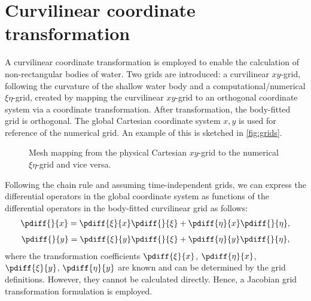 \chapter{Curvilinear coordinate transformation}\label{app:CoordinateTransform}
A curvilinear coordinate transformation is employed to enable the calculation of non-rectangular bodies of water.
Two grids are introduced: a curvilinear $xy$-grid, following the curvature of the shallow water body and a computational/numerical $\xi \eta$-grid, created by mapping the curvilinear $xy$-grid to an orthogonal coordinate system via a coordinate transformation.
After transformation, the body-fitted grid is orthogonal.
The global Cartesian coordinate system $x,y$ is used for reference of the numerical grid.
An example of this is sketched in \autoref{fig:grids}.
%
\begin{figure}[H]
    \begin{center}
        \def\svgwidth{0.80\textwidth} %
        \resizebox{0.99\textwidth}{!}{
            
        }
    \end{center}
	\caption{Mesh mapping from the physical Cartesian $xy$-grid to the numerical $\xi\eta$-grid and vice versa.}
\label{fig:grids}
\end{figure}
%
Following the chain rule and assuming time-independent grids, we can express the differential operators in the global coordinate system as functions of the differential operators in the body-fitted curvilinear grid as follows:
%
\begin{align}\label{1ordertransx}
	\pdiff{}{x} = \pdiff{\xi}{x} \pdiff{}{\xi}+\pdiff{\eta}{x}\pdiff{}{\eta},
\end{align}
\begin{align} \label{1ordertransy}
	\pdiff{}{y} = \pdiff{\xi}{y}\pdiff{}{\xi}+\pdiff{\eta}{y}\pdiff{}{\eta},
\end{align}
%
where the transformation coefficients $\pdiff{\xi}{x}$, $\pdiff{\eta}{x}$, $\pdiff{\xi}{y}$, $\pdiff{\eta}{y}$ are known and can be determined by the grid definitions.
However, they cannot be calculated directly.
Hence, a Jacobian grid transformation formulation is employed.

